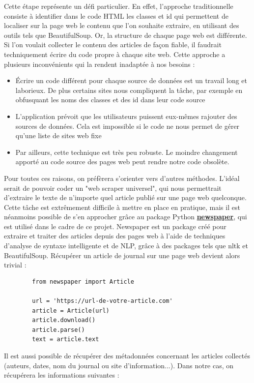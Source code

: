 \documentclass[french]{article}
\begin{document}
    Cette étape représente un défi particulier. En effet, l'approche traditionnelle consiste à identifier dans le code HTML les classes et id qui permettent de localiser sur la page web le contenu que l'on souhaite extraire, en utilisant des outils tels que BeautifulSoup. Or, la structure de chaque page web est différente. Si l'on voulait collecter le contenu des articles de façon fiable, il faudrait techniquement écrire du code propre à chaque site web. Cette approche a plusieurs inconvénients qui la rendent inadaptée à nos besoins :
    \begin{itemize}
        \item Écrire un code différent pour chaque source de données est un travail long et laborieux. De plus certains sites nous compliquent la tâche, par exemple en obfusquant les noms des classes et des id dans leur code source
        \item L'application prévoit que les utilisateurs puissent eux-mêmes rajouter des sources de données. Cela est impossible si le code ne nous permet de gérer qu'une liste de sites web fixe
        \item Par ailleurs, cette technique est très peu robuste. Le moindre changement apporté au code source des pages web peut rendre notre code obsolète.
    \end{itemize}
    Pour toutes ces raisons, on préfèrera s'orienter vers d'autres méthodes. L'idéal serait de pouvoir coder un "web scraper universel", qui nous permettrait d'extraire le texte de n'importe quel article publié sur une page web quelconque. Cette tâche est extrêmement difficile à mettre en place en pratique, mais il est néanmoins possible de s'en approcher grâce au package Python \textbf{\href{https://newspaper.readthedocs.io/en/latest/}{newspaper}}, qui est utilisé dans le cadre de ce projet.
    Newspaper est un package créé pour extraire et traiter des articles depuis des pages web à l'aide de techniques d'analyse de syntaxe intelligente et de NLP, grâce à des packages tels que nltk et BeautifulSoup. Récupérer un article de journal sur une page web devient alors trivial :
    \begin{verbatim}
        from newspaper import Article

        url = 'https://url-de-votre-article.com'
        article = Article(url)
        article.download()
        article.parse()
        text = article.text
    \end{verbatim}
    Il est aussi possible de récupérer des métadonnées concernant les articles collectés (auteurs, dates, nom du journal ou site d'information...). Dans notre cas, on récupérera les informations suivantes :
\end{document}
